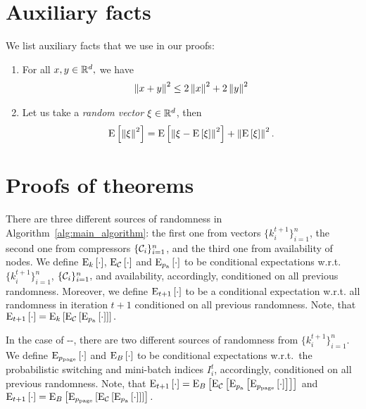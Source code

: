 \documentclass{article}
\newcommand*{\probavailable}{\ensuremath{p_{\textnormal{a}}}}
\newcommand*{\probpage}{\ensuremath{p_{\text{page}}}}
\begin{document}
\section{Auxiliary facts}
We list auxiliary facts that we use in our proofs:
\begin{enumerate}
    \item 
        For all $x, y \in \mathbb{R}^d,$ we have
        \begin{align}
            \left\| x + y \right\|^2 \leq 2\left\| x \right\|^2 + 2\left\| y \right\|^2
            \label{auxiliary:jensen_inequality}
        \end{align}
    \item
        Let us take a \textit{random vector} $\xi \in \mathbb{R}^d$, then
        \begin{align}
            {\rm E}\left[\left\| \xi \right\|^2\right] = {\rm E}\left[\left\| \xi - {\rm E}\left[\xi\right] \right\|^2\right] + \left\| {\rm E}\left[\xi\right] \right\|^2.
            \label{auxiliary:variance_decomposition}
        \end{align}
\end{enumerate}

\section{Proofs of theorems}

There are three different sources of randomness in Algorithm~\ref{alg:main_algorithm}: the first one from vectors $\{k_i^{t+1}\}_{i=1}^n$, the second one from compressors $\{\mathcal{C}_i\}_{i=1}^n$, and the third one from availability of nodes. We define ${\rm E}_{k}\left[\cdot\right]$, ${\rm E}_{\mathcal{C}}\left[\cdot\right]$ and $\ExpSub{\probavailable}{\cdot}$ to be conditional expectations w.r.t.\,$\{k_i^{t+1}\}_{i=1}^n$, $\{\mathcal{C}_i\}_{i=1}^n, $ and availability, accordingly, conditioned on all previous randomness. Moreover, we define ${\rm E}_{t+1}\left[\cdot\right]$ to be a conditional expectation w.r.t. all randomness in iteration $t+1$ conditioned on all previous randomness. Note, that $\ExpSub{t+1}{\cdot} = \ExpSub{k}{\ExpSub{\cC}{\ExpSub{\probavailable}{\cdot}}}.$

In the case of --, there are two different sources of randomness from $\{k_i^{t+1}\}_{i=1}^n$. We define $\ExpSub{\probpage}{\cdot}$ and ${\rm E}_{B}\left[\cdot\right]$ to be conditional expectations w.r.t.\, the probabilistic switching and mini-batch indices $I_{i}^t$, accordingly, conditioned on all previous randomness. Note, that $\ExpSub{t+1}{\cdot} = \ExpSub{B}{\ExpSub{\cC}{\ExpSub{\probavailable}{\ExpSub{\probpage}{\cdot}}}}$ and $\ExpSub{t+1}{\cdot} = \ExpSub{B}{\ExpSub{\probpage}{\ExpSub{\cC}{\ExpSub{\probavailable}{\cdot}}}}.$
\end{document}
